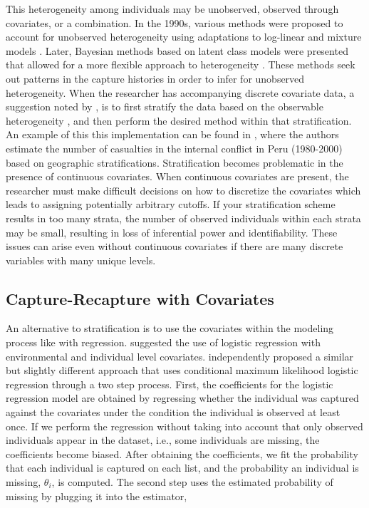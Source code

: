 \documentclass[
  12pt,
]{article}
\begin{document}
This heterogeneity among individuals may be unobserved, observed through
covariates, or a combination. In the 1990s, various methods were
proposed to account for unobserved heterogeneity using adaptations to
log-linear and mixture models
\citep{darroch_three-sample_1993,agresti_simple_1994,pledger_unified_2000}.
Later, Bayesian methods based on latent class models were presented that
allowed for a more flexible approach to heterogeneity
\citep{fienberg_classical_1999,manrique-vallier_population_2008,manriquevallier_bayesian_2016}.
These methods seek out patterns in the capture histories in order to
infer for unobserved heterogeneity. When the researcher has accompanying
discrete covariate data, a suggestion noted by
\cite{darroch_three-sample_1993}, is to first stratify the data based on
the observable heterogeneity \citep{sekar_method_1949}, and then perform
the desired method within that stratification. An example of this this
implementation can be found in \cite{manrique-vallier_estimating_2019},
where the authors estimate the number of casualties in the internal
conflict in Peru (1980-2000) based on geographic stratifications.
Stratification becomes problematic in the presence of continuous
covariates. When continuous covariates are present, the researcher must
make difficult decisions on how to discretize the covariates which leads
to assigning potentially arbitrary cutoffs. If your stratification
scheme results in too many strata, the number of observed individuals
within each strata may be small, resulting in loss of inferential power
and identifiability. These issues can arise even without continuous
covariates if there are many discrete variables with many unique levels.

\subsection{Capture-Recapture with Covariates}

An alternative to stratification is to use the covariates within the
modeling process like with regression. \cite{pollock_use_1984} suggested
the use of logistic regression with environmental and individual level
covariates. \cite{huggins_statistical_1989,alho_logistic_1990}
independently proposed a similar but slightly different approach that
uses conditional maximum likelihood logistic regression through a two
step process. First, the coefficients for the logistic regression model
are obtained by regressing whether the individual was captured against
the covariates under the condition the individual is observed at least
once. If we perform the regression without taking into account that only
observed individuals appear in the dataset, i.e., some individuals are
missing, the coefficients become biased. After obtaining the
coefficients, we fit the probability that each individual is captured on
each list, and the probability an individual is missing, \(\theta_i\),
is computed. The second step uses the estimated probability of missing
by plugging it into the \cite{horvitz_generalization_1952} estimator,
\end{document}
